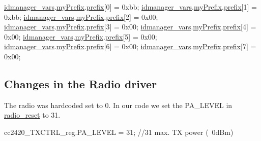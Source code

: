 \begin{DoxyCodeInclude}
   \hyperlink{idmanager_8c_a3b050a996ba4875e4327fb81fbb18c5b}{idmanager\_vars}.\hyperlink{structidmanager__vars__t_ad563fc083ecc8c561374241382e76c89}{myPrefix}.\hyperlink{structopen__addr__t_a026c06dfd492ddbde8e4d4254fd35ce3}{prefix}[0]   = 0xbb;
   \hyperlink{idmanager_8c_a3b050a996ba4875e4327fb81fbb18c5b}{idmanager\_vars}.\hyperlink{structidmanager__vars__t_ad563fc083ecc8c561374241382e76c89}{myPrefix}.\hyperlink{structopen__addr__t_a026c06dfd492ddbde8e4d4254fd35ce3}{prefix}[1]   = 0xbb;
   \hyperlink{idmanager_8c_a3b050a996ba4875e4327fb81fbb18c5b}{idmanager\_vars}.\hyperlink{structidmanager__vars__t_ad563fc083ecc8c561374241382e76c89}{myPrefix}.\hyperlink{structopen__addr__t_a026c06dfd492ddbde8e4d4254fd35ce3}{prefix}[2]   = 0x00;
   \hyperlink{idmanager_8c_a3b050a996ba4875e4327fb81fbb18c5b}{idmanager\_vars}.\hyperlink{structidmanager__vars__t_ad563fc083ecc8c561374241382e76c89}{myPrefix}.\hyperlink{structopen__addr__t_a026c06dfd492ddbde8e4d4254fd35ce3}{prefix}[3]   = 0x00;
   \hyperlink{idmanager_8c_a3b050a996ba4875e4327fb81fbb18c5b}{idmanager\_vars}.\hyperlink{structidmanager__vars__t_ad563fc083ecc8c561374241382e76c89}{myPrefix}.\hyperlink{structopen__addr__t_a026c06dfd492ddbde8e4d4254fd35ce3}{prefix}[4]   = 0x00;
   \hyperlink{idmanager_8c_a3b050a996ba4875e4327fb81fbb18c5b}{idmanager\_vars}.\hyperlink{structidmanager__vars__t_ad563fc083ecc8c561374241382e76c89}{myPrefix}.\hyperlink{structopen__addr__t_a026c06dfd492ddbde8e4d4254fd35ce3}{prefix}[5]   = 0x00;
   \hyperlink{idmanager_8c_a3b050a996ba4875e4327fb81fbb18c5b}{idmanager\_vars}.\hyperlink{structidmanager__vars__t_ad563fc083ecc8c561374241382e76c89}{myPrefix}.\hyperlink{structopen__addr__t_a026c06dfd492ddbde8e4d4254fd35ce3}{prefix}[6]   = 0x00;
   \hyperlink{idmanager_8c_a3b050a996ba4875e4327fb81fbb18c5b}{idmanager\_vars}.\hyperlink{structidmanager__vars__t_ad563fc083ecc8c561374241382e76c89}{myPrefix}.\hyperlink{structopen__addr__t_a026c06dfd492ddbde8e4d4254fd35ce3}{prefix}[7]   = 0x00;
\end{DoxyCodeInclude}
 \hypertarget{_l_k_n_contribution_Radio_edits}{}\subsection{Changes in the Radio driver}\label{_l_k_n_contribution_Radio_edits}
The radio was hardcoded set to 0. In our code we set the P\+A\+\_\+\+L\+E\+V\+EL in \hyperlink{group__radio_gaf181029cf06b94f0f4ceaafec1c3f209}{radio\+\_\+reset} to 31. 
\begin{DoxyCodeInclude}
   cc2420\_TXCTRL\_reg.PA\_LEVEL               = 31; \textcolor{comment}{//31 max. TX power (~0dBm)}
\end{DoxyCodeInclude}
